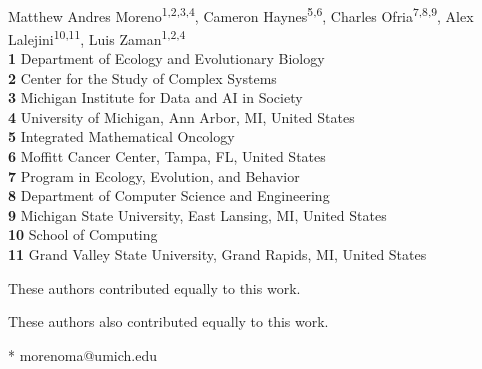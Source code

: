 \begin{flushleft}
{\Large
\textbf{} %
}
\newline
\\
Matthew Andres Moreno\textsuperscript{1,2,3,4\Yinyang*},
Cameron Haynes\textsuperscript{5,6\Yinyang},
Charles Ofria\textsuperscript{7,8,9},
Alex Lalejini\textsuperscript{10,11\ddag},
Luis Zaman\textsuperscript{1,2,4\ddag}
\\
\bigskip
\textbf{1} Department of Ecology and Evolutionary Biology\\
\textbf{2} Center for the Study of Complex Systems\\
\textbf{3} Michigan Institute for Data and AI in Society\\
\textbf{4} University of Michigan, Ann Arbor, MI, United States\\
\textbf{5} Integrated Mathematical Oncology\\
\textbf{6} Moffitt Cancer Center, Tampa, FL, United States\\
\textbf{7} Program in Ecology, Evolution, and Behavior\\
\textbf{8} Department of Computer Science and Engineering\\
\textbf{9} Michigan State University, East Lansing, MI, United States\\
\textbf{10} School of Computing\\
\textbf{11} Grand Valley State University, Grand Rapids, MI, United States\\
\bigskip

%
%
\Yinyang These authors contributed equally to this work.

\ddag These authors also contributed equally to this work.




* morenoma@umich.edu

\end{flushleft}
